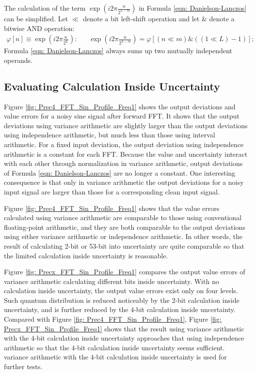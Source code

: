 \documentclass[twoside]{article}
\numberwithin{equation}{section}
\newcommand{\eqspace}{\;\;\;}
\begin{document}
The calculation of the term $\exp{(i 2\pi \frac{n}{2^{L-m}})}$ in Formula \eqref{eqn: Danielson-Lanczos} can be simplified.  
Let $\ll$ denote a bit left-shift operation and let \& denote a bitwise AND operation:
\begin{align}
\label{eqn: FFT phase array}
\varphi [n] \equiv \exp{(i 2\pi \frac{n}{2^{L}})}: \eqspace & \exp{(i 2\pi \frac{n}{2^{L-m}})} = \varphi [(n \ll m)\& ((1 \ll L)-1)];
\end{align}
Formula \eqref{eqn: Danielson-Lanczos} always sums up two mutually independent operands.  









\subsection{Evaluating Calculation Inside Uncertainty}

Figure \ref{fig: Prec4_FFT_Sin_Profile_Freq1} shows the output deviations and value errors for a noisy sine signal after forward FFT.  It shows that the output deviations using variance arithmetic are slightly larger than the output deviations using independence arithmetic, but much less than those using interval arithmetic.  For a fixed input deviation, the output deviation using independence arithmetic is a constant for each FFT.  Because the value and uncertainty interact with each other through normalization in variance arithmetic, output deviations of Formula \eqref{eqn: Danielson-Lanczos} are no longer a constant.  One interesting consequence is that only in variance arithmetic the output deviations for a noisy input signal are larger than those for a corresponding clean input signal.

Figure \ref{fig: Prec4_FFT_Sin_Profile_Freq1} shows that the value errors calculated using variance arithmetic are comparable to those using conventional floating-point arithmetic, and they are both comparable to the output deviations using either variance arithmetic or independence arithmetic.  In other words, the result of calculating 2-bit or 53-bit into uncertainty are quite comparable so that the limited calculation inside uncertainty is reasonable.  

Figure \ref{fig: Precx_FFT_Sin_Profile_Freq1} compares the output value errors of variance arithmetic calculating different bits inside uncertainty.  With no calculation inside uncertainty, the output value errors exist only on four levels.  Such quantum distribution is reduced noticeably by the 2-bit calculation inside uncertainty, and is further reduced by the 4-bit calculation inside uncertainty.  Compared with Figure \ref{fig: Prec4_FFT_Sin_Profile_Freq1}, Figure \ref{fig: Precx_FFT_Sin_Profile_Freq1} shows that the result using variance arithmetic with the 4-bit calculation inside uncertainty approaches that using independence arithmetic so that the 4-bit calculation inside uncertainty seems sufficient.  variance arithmetic with the 4-bit calculation inside uncertainty is used for further tests.
\end{document}
